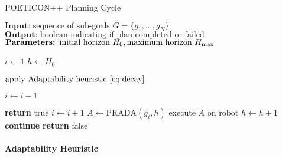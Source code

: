 \begin{algorithm}
\caption{POETICON++ Planning Cycle} \label{algo:planning_cycle}
\begin{algorithmic}[5]
\State $\textbf{Input: } \text{sequence of sub-goals } G = \{g_1, \ldots, g_N\}$
\State $\textbf{Output: } \text{boolean indicating if plan completed or failed}$
\State $\textbf{Parameters: } \text{initial horizon } H_0, \text{maximum horizon } H_{\text{max}}$

\Statex

\State $i \gets 1$ 
\State $h \gets H_0$ 

    \Statex

     \label{code:adaptability}
        \State $\text{apply Adaptability heuristic \eqref{eq:decay}}$
    \EndIf

    \Statex

     \label{code:goal_maintenance}
        \State $i \gets i-1$ 
    \EndIf

    \Statex

            \State \textbf{return } true 
        \Else
            \State $i \gets i+1$ 
        \EndIf
    \Else
        \State $A \gets \text{PRADA}(g_i,h)$ 
            \State execute $A$ on robot \label{code:execute_action}
            \State $h \gets h+1$ 
                \State \textbf{continue} 
              \label{code:creativity}
                 
                \State \textbf{return } false 
            \EndIf
        \EndIf
    \EndIf
\EndWhile
\end{algorithmic}
\end{algorithm}

\paragraph{Adaptability Heuristic}
\label{heu:adaptability}

